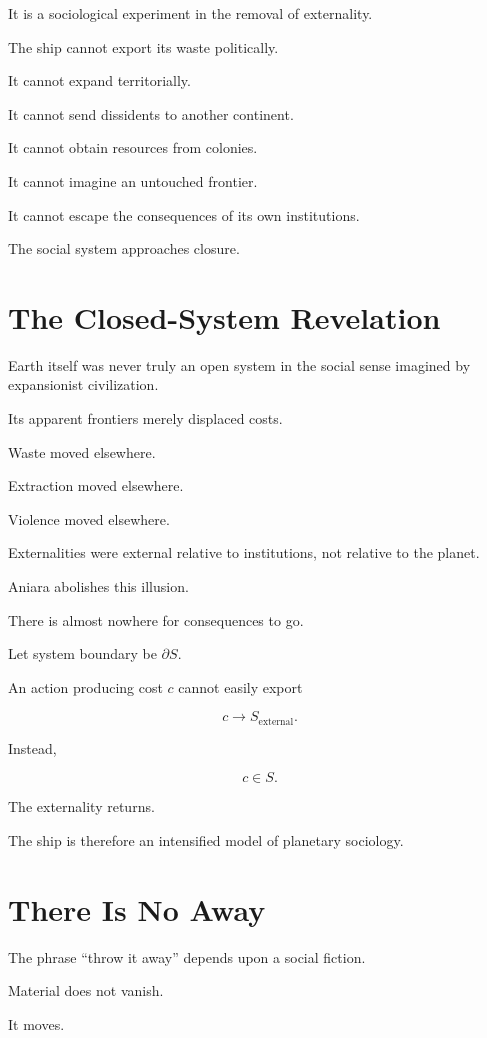 \documentclass[11pt,oneside]{book}
\theoremstyle{definition}
\theoremstyle{remark}
\begin{document}
It is a sociological experiment in the removal of externality.

The ship cannot export its waste politically.

It cannot expand territorially.

It cannot send dissidents to another continent.

It cannot obtain resources from colonies.

It cannot imagine an untouched frontier.

It cannot escape the consequences of its own institutions.

The social system approaches closure.

\section{The Closed-System Revelation}

Earth itself was never truly an open system in the social sense imagined by expansionist civilization.

Its apparent frontiers merely displaced costs.

Waste moved elsewhere.

Extraction moved elsewhere.

Violence moved elsewhere.

Externalities were external relative to institutions, not relative to the planet.

Aniara abolishes this illusion.

There is almost nowhere for consequences to go.

Let system boundary be \(\partial S\).

An action producing cost \(c\) cannot easily export

\[
c\rightarrow S_{\mathrm{external}}.
\]

Instead,

\[
c\in S.
\]

The externality returns.

The ship is therefore an intensified model of planetary sociology.

\section{There Is No Away}

The phrase ``throw it away'' depends upon a social fiction.

Material does not vanish.

It moves.
\end{document}
